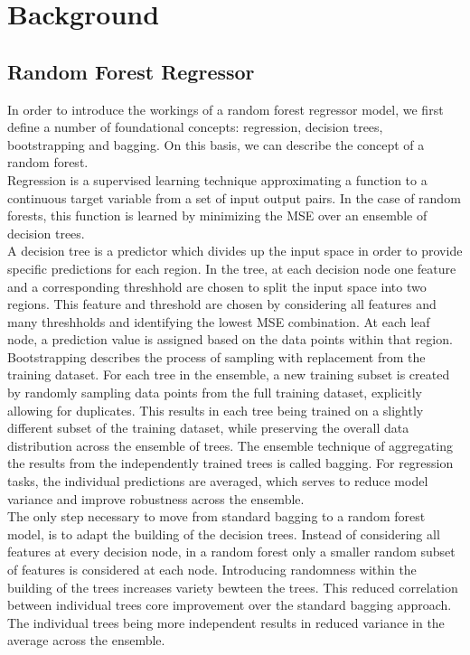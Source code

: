 \chapter{Background}\label{chap:background}




\section{Random Forest Regressor}

In order to introduce the workings of a random forest regressor model, we first define a number of foundational concepts: regression, decision trees, bootstrapping and bagging. On this basis, we can describe the concept of a random forest. \\
Regression is a supervised learning technique approximating a function to a continuous target variable from a set of input output pairs. In the case of random forests, this function is learned by minimizing the MSE over an ensemble of decision trees. \\
A decision tree is a predictor which divides up the input space in order to provide specific predictions for each region. In the tree, at each decision node one feature and a corresponding threshhold are chosen to split the input space into two regions. This feature and threshold are chosen by considering all features and many threshholds and identifying the lowest MSE combination. At each leaf node, a prediction value is assigned based on the data points within that region. \\
Bootstrapping describes the process of sampling with replacement from the training dataset. For each tree in the ensemble, a new training subset is created by randomly sampling data points from the full training dataset, explicitly allowing for duplicates. This results in each tree being trained on a slightly different subset of the training dataset, while preserving the overall data distribution across the ensemble of trees. The ensemble technique of aggregating the results from the independently trained trees is called bagging. For regression tasks, the individual predictions are averaged, which serves to reduce model variance and improve robustness across the ensemble. \\
The only step necessary to move from standard bagging to a random forest model, is to adapt the building of the decision trees. Instead of considering all features at every decision node, in a random forest only a smaller random subset of features is considered at each node. Introducing randomness within the building of the trees increases variety bewteen the trees. This reduced correlation between individual trees core improvement over the standard bagging approach. The individual trees being more independent results in reduced variance in the average across the ensemble. \\
